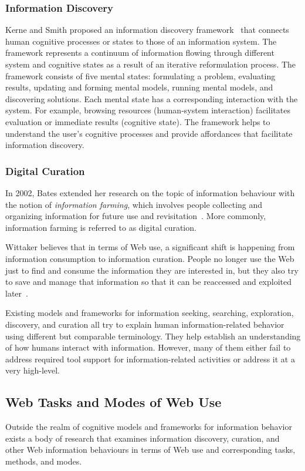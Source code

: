 \documentclass{sigchi}
\begin{document}
\subsubsection{Information Discovery}
Kerne and Smith proposed an information discovery framework~\cite{kerne2004information} that connects human cognitive processes or states to those of an information system. The framework represents a continuum of information flowing through different system and cognitive states as a result of an iterative reformulation process. The framework consists of five mental states: formulating a problem, evaluating results, updating and forming mental models, running mental models, and discovering solutions. Each mental state has a corresponding interaction with the system. For example, browsing resources (human-system interaction) facilitates evaluation or immediate results (cognitive state). The framework helps to understand the user's cognitive processes and provide affordances that facilitate information discovery.
   
\subsubsection{Digital Curation}
In 2002, Bates extended her research on the topic of information behaviour with the notion of \textit{information farming}, which involves people collecting and organizing information for future use and revisitation~\cite{bates2002toward}. More commonly, information farming is referred to as digital curation. 

Wittaker believes that in terms of Web use, a significant shift is happening from information consumption to information curation. People no longer use the Web just to find and consume the information they are interested in, but they also try to save and manage that information so that it can be reaccessed and exploited later~\cite{whittaker2011personal}. 

Existing models and frameworks for information seeking, searching, exploration, discovery, and curation all try to explain human information-related behavior using different but comparable terminology. They help establish an understanding of how humans interact with information. However, many of them either fail to address required tool support for information-related activities or address it at a very high-level.  

\subsection{Web Tasks and Modes of Web Use}
Outside the realm of cognitive models and frameworks for information behavior exists a body of research that examines information discovery, curation, and other Web information behaviours in terms of Web use and corresponding tasks, methods, and modes.
\end{document}
